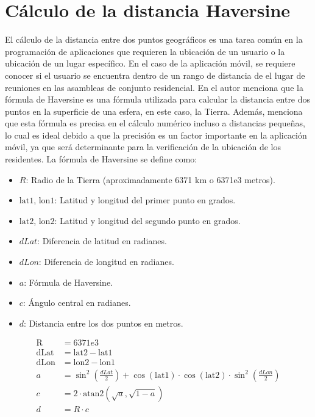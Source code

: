 \section{Cálculo de la distancia Haversine}\label{sec:calculo-de-la-distancia-haversine}

El cálculo de la distancia entre dos puntos geográficos es una tarea común en la programación de aplicaciones que requieren la ubicación de un usuario o la ubicación de un lugar específico.
En el caso de la aplicación móvil, se requiere conocer si el usuario se encuentra dentro de un rango de distancia de el lugar de reuniones en las asambleas de conjunto residencial.
\bigbreak
En \cite{camino_costa_desarrollo_2012} el autor menciona que la fórmula de Haversine es una fórmula utilizada para calcular la distancia entre dos puntos en la superficie de una esfera, en este caso, la Tierra.
Además, menciona que esta fórmula es precisa en el cálculo numérico incluso a distancias pequeñas, lo cual es ideal debido a que la precisión es un factor importante en la aplicación móvil, ya que será determinante para la verificación de la ubicación de los residentes.
\bigbreak
La fórmula de Haversine se define como:


\begin{itemize}
  \item $R$: Radio de la Tierra (aproximadamente 6371 km o 6371e3 metros).
  \item $\text{lat1}$, $\text{lon1}$: Latitud y longitud del primer punto en grados.
  \item $\text{lat2}$, $\text{lon2}$: Latitud y longitud del segundo punto en grados.
  \item $dLat$: Diferencia de latitud en radianes.
  \item $dLon$: Diferencia de longitud en radianes.
  \item $a$: Fórmula de Haversine.
  \item $c$: Ángulo central en radianes.
  \item $d$: Distancia entre los dos puntos en metros.
\end{itemize}


\begin{equation}
    \begin{aligned}
        \text{R} &= 6371e3 \\
        \text{dLat} &= \text{lat2} - \text{lat1} \\
        \text{dLon} &= \text{lon2} - \text{lon1} \\
        a &= \sin^2\left(\frac{dLat}{2}\right) + \cos(\text{lat1}) \cdot \cos(\text{lat2}) \cdot \sin^2\left(\frac{dLon}{2}\right) \\
        c &= 2 \cdot \text{atan2}\left(\sqrt{a}, \sqrt{1-a}\right) \\
        d &= R \cdot c \\
    \end{aligned}\label{eq:equation3}
\end{equation}





